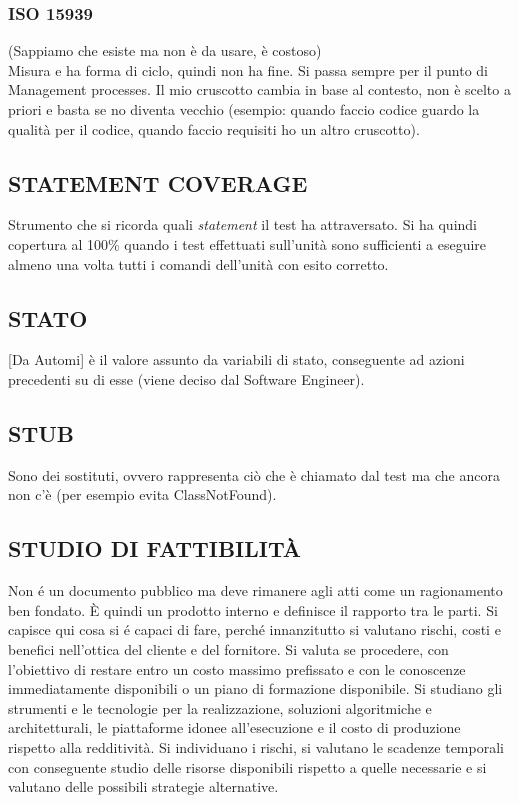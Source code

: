 			\subsubsection{ISO 15939}	%
			(Sappiamo che esiste ma non è da usare, è costoso) \\
			Misura e ha forma di ciclo, quindi non ha fine. Si passa sempre per il punto di Management processes. Il mio cruscotto cambia in base al contesto, non è scelto a priori e basta se no diventa vecchio (esempio: quando faccio codice guardo la qualità per il codice, quando faccio requisiti ho un altro cruscotto). 
					
		\subsection{STATEMENT COVERAGE}	\label{statementcoverage}	
		Strumento che si ricorda quali \textit{statement} il test ha attraversato. Si ha quindi copertura al 100\% quando i test effettuati sull'unità sono sufficienti a eseguire almeno una volta tutti i comandi dell'unità con esito corretto.
					
			
		\subsection{STATO}  \label{stato}
		[Da Automi] è il valore assunto da variabili di stato, conseguente ad azioni precedenti su di esse (viene deciso dal Software Engineer).
		
		\subsection{STUB}		\label{stub}
		Sono dei sostituti, ovvero rappresenta ciò che è chiamato dal test ma che ancora non c'è (per esempio evita ClassNotFound).
	
		\subsection{STUDIO DI FATTIBILITÀ}  \label{studiofattibilita}
		Non é un documento pubblico ma deve rimanere agli atti come un ragionamento ben fondato. È quindi un prodotto interno e definisce il rapporto tra le parti. Si capisce qui cosa si é capaci di fare, perché innanzitutto si valutano rischi, costi e benefici nell'ottica del cliente e del fornitore. Si valuta se procedere, con l’obiettivo di restare entro un costo massimo prefissato e con le conoscenze immediatamente disponibili o un piano di formazione disponibile. Si studiano gli strumenti e le tecnologie per la realizzazione, soluzioni algoritmiche e architetturali, le piattaforme idonee all'esecuzione e il costo di produzione rispetto alla redditività. Si individuano i rischi, si valutano le scadenze temporali con conseguente studio delle risorse disponibili rispetto a quelle necessarie e si valutano delle possibili strategie alternative.
	
	
